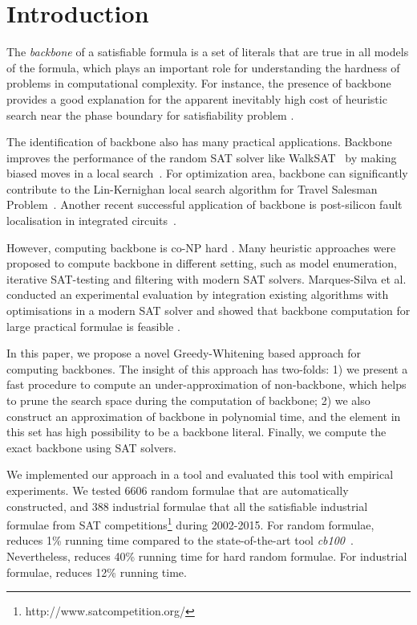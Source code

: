 

\section{Introduction}
The \textit{backbone} of a satisfiable formula is a set of literals that are true in all models of the formula,
which plays an important role for understanding the hardness of problems in computational complexity.
For instance, the presence of backbone provides a good explanation for the apparent inevitably high cost of heuristic search near the phase boundary  for satisfiability problem \cite{MZKST99}.

The identification of backbone also has many practical applications. Backbone improves the performance of the random SAT solver like  WalkSAT~\cite{SBK1993} by making biased moves in a local search~\cite{ZWR2003,MAR2007}. For optimization area,  backbone can significantly contribute to the Lin-Kernighan local search algorithm for Travel Salesman Problem~\cite{ZWL2005}. Another recent successful application of backbone is post-silicon fault localisation in integrated circuits~\cite{ZWSM11,ZWM11}.

However, computing backbone is co-NP hard \cite{Jan10}.  Many heuristic approaches were proposed to compute backbone in different setting, such as model enumeration, iterative SAT-testing and filtering with modern SAT solvers.
Marques-Silva et al.  conducted an experimental evaluation by integration existing algorithms with optimisations in a modern SAT solver and showed that backbone computation for large practical formulae is feasible \cite{MJML2010,JLMS12,JLM15}.


In this paper, we propose a novel Greedy-Whitening based approach \tool for computing backbones. The insight of this approach has two-folds: 1) we present a fast procedure to compute an under-approximation of non-backbone, which helps to prune the search space during the computation of backbone; 2) we also construct an approximation of backbone in polynomial time, and the element in this set has high possibility to be a backbone literal.
Finally, we compute the exact backbone using SAT solvers.

We implemented our approach in a tool \tool and evaluated this tool with empirical experiments. We tested 6606 random formulae that are automatically constructed, and 388 industrial formulae that all the satisfiable industrial formulae from SAT competitions\footnote{http://www.satcompetition.org/} during 2002-2015. For random formulae, \tool reduces 1\% running time compared to the state-of-the-art tool \textit{cb100}~\cite{JLM15}. Nevertheless, \tool reduces 40\% running time for hard random formulae. For industrial formulae, \tool reduces 12\% running time.


